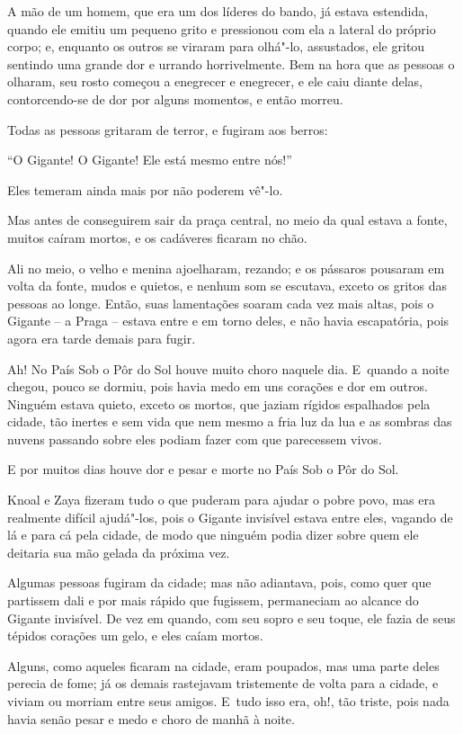 A mão de um homem, que era um dos líderes do bando, já estava estendida,
quando ele emitiu um pequeno grito e pressionou com ela a lateral do
próprio corpo; e, enquanto os outros se viraram para olhá"-lo,
assustados, ele gritou sentindo uma grande dor e urrando horrivelmente.
Bem na hora que as pessoas o olharam, seu rosto começou a enegrecer e
enegrecer, e ele caiu diante delas, contorcendo-se de dor por alguns momentos, e
então morreu.

Todas as pessoas gritaram de terror, e fugiram aos berros:

``O Gigante! O Gigante! Ele está mesmo entre nós!''

Eles temeram ainda mais por não poderem vê"-lo.

Mas antes de conseguirem sair da praça central, no meio da qual
estava a fonte, muitos caíram mortos, e os cadáveres ficaram no chão.

Ali no meio, o velho e menina ajoelharam, rezando; e os pássaros
pousaram em volta da fonte, mudos e quietos, e nenhum som se escutava,
exceto os gritos das pessoas ao longe. Então, suas lamentações soaram
cada vez mais altas, pois o Gigante -- a Praga -- estava entre e em
torno deles, e não havia escapatória, pois agora era tarde demais para
fugir.

Ah! No País Sob o Pôr do Sol houve muito choro naquele dia. E~quando a
noite chegou, pouco se dormiu, pois havia medo em uns corações e dor
em outros. Ninguém estava quieto, exceto os mortos, que jaziam rígidos
espalhados pela cidade, tão inertes e sem vida que nem mesmo a fria luz da lua e as
sombras das nuvens passando sobre eles podiam fazer com que parecessem
vivos.

E por muitos dias houve dor e pesar e morte no País Sob o Pôr do Sol.

Knoal e Zaya fizeram tudo o que puderam para ajudar o pobre povo, mas
era realmente difícil ajudá"-los, pois o Gigante invisível estava entre
eles, vagando de lá e para cá pela cidade, de modo que ninguém podia
dizer sobre quem ele deitaria sua mão gelada da próxima vez.

Algumas pessoas fugiram da cidade; mas não adiantava, pois, como quer
que partissem dali e por mais rápido que fugissem, permaneciam ao
alcance do Gigante invisível. De vez em quando, com seu sopro e seu
toque, ele fazia de seus tépidos corações um gelo, e eles caíam mortos.

Alguns, como aqueles ficaram na cidade, eram poupados, mas uma parte
deles perecia de fome; já os demais rastejavam tristemente de volta para
a cidade, e viviam ou morriam entre seus amigos. E~tudo isso era, oh!,
tão triste, pois nada havia senão pesar e medo e choro de manhã à noite.

